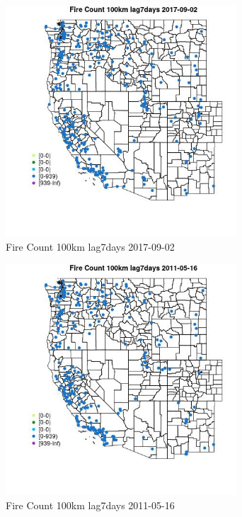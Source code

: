 \begin{figure} 
\centering  
\includegraphics[width=0.77\textwidth]{Code_Outputs/Report_ML_input_PM25_Step4_part_e_de_duplicated_aves_compiled_2019-05-21wNAs_MapObsFire_Count_100km_lag7days2017-09-02.jpg} 
\caption{\label{fig:Report_ML_input_PM25_Step4_part_e_de_duplicated_aves_compiled_2019-05-21wNAsMapObsFire_Count_100km_lag7days2017-09-02}Fire Count 100km lag7days 2017-09-02} 
\end{figure} 
 

\clearpage 

\begin{figure} 
\centering  
\includegraphics[width=0.77\textwidth]{Code_Outputs/Report_ML_input_PM25_Step4_part_e_de_duplicated_aves_compiled_2019-05-21wNAs_MapObsFire_Count_100km_lag7days2011-05-16.jpg} 
\caption{\label{fig:Report_ML_input_PM25_Step4_part_e_de_duplicated_aves_compiled_2019-05-21wNAsMapObsFire_Count_100km_lag7days2011-05-16}Fire Count 100km lag7days 2011-05-16} 
\end{figure} 
 

